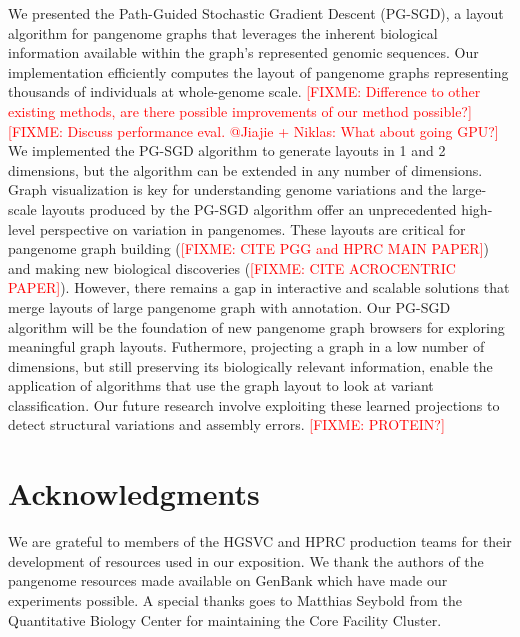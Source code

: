 \documentclass{bioinfo}
\theoremstyle{definition}
\newcommand{\red}[1]{{\textcolor{Red}{#1}}}
\newcommand{\FIXME}[1]{\red{[FIXME: #1]}}
\begin{document}
    We presented the Path-Guided Stochastic Gradient Descent (PG-SGD), a layout algorithm for pangenome graphs that
    leverages the inherent biological information available within the graph's represented genomic sequences.
    Our implementation efficiently computes the layout of pangenome graphs representing thousands of individuals at whole-genome scale.
    \FIXME{Difference to other existing methods, are there possible improvements of our method possible?}
    \FIXME{Discuss performance eval. @Jiajie + Niklas: What about going GPU?}
    We implemented the PG-SGD algorithm to generate layouts in 1 and 2 dimensions, but the algorithm can be extended in any number of dimensions.
    Graph visualization is key for understanding genome variations and the large-scale layouts produced by the PG-SGD algorithm offer an unprecedented 
    high-level perspective on variation in pangenomes. These layouts are critical for pangenome graph building (\FIXME{CITE PGG and HPRC MAIN PAPER}) and 
    making new biological discoveries (\FIXME{CITE ACROCENTRIC PAPER}).
    However, there remains a gap in interactive and scalable solutions that merge layouts of large pangenome graph with annotation.
    Our PG-SGD algorithm will be the foundation of new pangenome graph browsers for exploring meaningful graph layouts.
    Futhermore, projecting a graph in a low number of dimensions, but still preserving its biologically relevant information, enable the application of 
    algorithms that use the graph layout to look at variant classification.
    Our future research involve exploiting these learned projections to detect structural variations and assembly errors.
    \FIXME{PROTEIN?}


    \section*{Acknowledgments}

    We are grateful to members of the HGSVC and HPRC production teams for their development of resources used in our exposition.
    We thank the authors of the pangenome resources made available on GenBank which have made our experiments possible.
    A special thanks goes to Matthias Seybold from the Quantitative Biology Center for maintaining the Core Facility Cluster.
\end{document}
